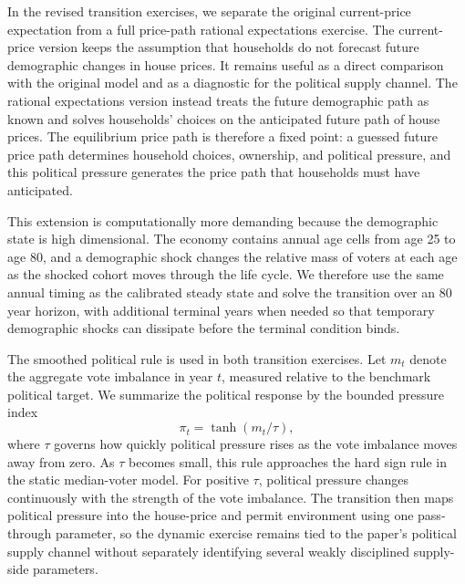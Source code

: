

{\color{blue}
In the revised transition exercises, we separate the original current-price expectation from a full price-path rational expectations exercise. The current-price version keeps the assumption that households do not forecast future demographic changes in house prices. It remains useful as a direct comparison with the original model and as a diagnostic for the political supply channel. The rational expectations version instead treats the future demographic path as known and solves households' choices on the anticipated future path of house prices. The equilibrium price path is therefore a fixed point: a guessed future price path determines household choices, ownership, and political pressure, and this political pressure generates the price path that households must have anticipated.

This extension is computationally more demanding because the demographic state is high dimensional. The economy contains annual age cells from age 25 to age 80, and a demographic shock changes the relative mass of voters at each age as the shocked cohort moves through the life cycle. We therefore use the same annual timing as the calibrated steady state and solve the transition over an 80 year horizon, with additional terminal years when needed so that temporary demographic shocks can dissipate before the terminal condition binds.
}


{\color{blue}
The smoothed political rule is used in both transition exercises. Let $m_t$ denote the aggregate vote imbalance in year $t$, measured relative to the benchmark political target. We summarize the political response by the bounded pressure index
\[
    \pi_t = \tanh(m_t/\tau),
\]
where $\tau$ governs how quickly political pressure rises as the vote imbalance moves away from zero. As $\tau$ becomes small, this rule approaches the hard sign rule in the static median-voter model. For positive $\tau$, political pressure changes continuously with the strength of the vote imbalance. The transition then maps political pressure into the house-price and permit environment using one pass-through parameter, so the dynamic exercise remains tied to the paper's political supply channel without separately identifying several weakly disciplined supply-side parameters.
}

